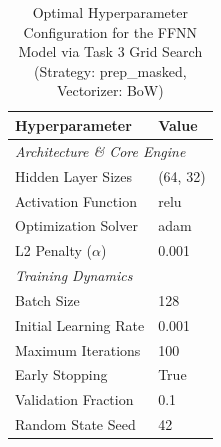 \begin{table}[H]
    \centering
    \caption{Optimal Hyperparameter Configuration for the FFNN Model via Task 3 Grid Search (Strategy: prep_masked, Vectorizer: BoW)}
    \label{tab:task3_ffnn_hyperparameters}
    \small
    \begin{tabular}{ll}
    \toprule
    \textbf{Hyperparameter} & \textbf{Value} \\
    \midrule
    \multicolumn{2}{l}{\textit{Architecture \& Core Engine}} \\
    Hidden Layer Sizes & (64, 32) \\
Activation Function & relu \\
Optimization Solver & adam \\
L2 Penalty ($\alpha$) & 0.001 \\
\midrule
    \multicolumn{2}{l}{\textit{Training Dynamics}} \\
    Batch Size & 128 \\
Initial Learning Rate & 0.001 \\
Maximum Iterations & 100 \\
Early Stopping & True \\
Validation Fraction & 0.1 \\
Random State Seed & 42 \\
\bottomrule
    \end{tabular}
    \end{table}
    